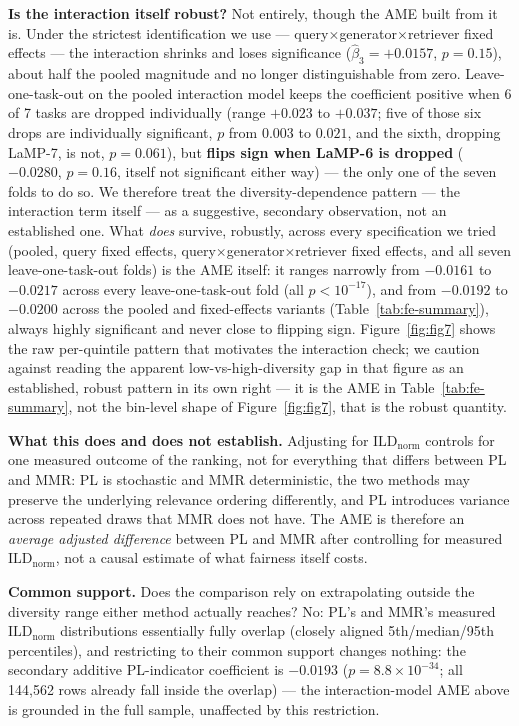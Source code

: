 \documentclass[11pt]{article}
\newcommand{\ild}{\ensuremath{\mathrm{ILD}}}
\newcommand{\ildnorm}{\ensuremath{\ild_{\mathrm{norm}}}}
\begin{document}
\textbf{Is the interaction itself robust?} Not entirely, though the AME
built from it is. Under the strictest identification we use ---
query$\times$generator$\times$retriever fixed effects --- the interaction
shrinks and loses significance ($\hat\beta_3=+0.0157$, $p=0.15$), about
half the pooled magnitude and no longer distinguishable from zero.
Leave-one-task-out on the pooled interaction model keeps the coefficient
positive when 6 of 7 tasks are dropped individually (range $+0.023$ to
$+0.037$; five of those six drops are individually significant, $p$ from
$0.003$ to $0.021$, and the sixth, dropping LaMP-7, is not, $p=0.061$),
but \textbf{flips sign when LaMP-6 is dropped} ($-0.0280$, $p=0.16$, itself
not significant either way) --- the only one of the seven folds to do so. We therefore treat the diversity-dependence
pattern --- the interaction term itself --- as a suggestive, secondary
observation, not an established one. What \emph{does} survive, robustly,
across every specification we tried (pooled, query fixed effects,
query$\times$generator$\times$retriever fixed effects, and all seven
leave-one-task-out folds) is the AME itself: it ranges narrowly from
$-0.0161$ to $-0.0217$ across every leave-one-task-out fold (all
$p<10^{-17}$), and from $-0.0192$ to $-0.0200$ across the pooled and
fixed-effects variants (Table~\ref{tab:fe-summary}), always
highly significant and never close to flipping sign. Figure~\ref{fig:fig7}
shows the raw per-quintile pattern that motivates the interaction check;
we caution against reading the apparent low-vs-high-diversity gap in that
figure as an established, robust pattern in its own right --- it is the
AME in Table~\ref{tab:fe-summary}, not the bin-level shape of
Figure~\ref{fig:fig7}, that is the robust quantity.

\textbf{What this does and does not establish.} Adjusting for \ildnorm{}
controls for one measured outcome of the ranking, not for everything that
differs between PL and MMR: PL is stochastic and MMR deterministic, the
two methods may preserve the underlying relevance ordering differently,
and PL introduces variance across repeated draws that MMR does not have.
The AME is therefore an \emph{average adjusted difference} between PL and
MMR after controlling for measured \ildnorm{}, not a causal estimate of
what fairness itself costs.

\textbf{Common support.} Does the comparison rely on extrapolating outside
the diversity range either method actually reaches? No: PL's and MMR's
measured \ildnorm{} distributions essentially fully overlap (closely
aligned 5th/median/95th percentiles), and restricting to their common
support changes nothing: the secondary additive PL-indicator coefficient
is $-0.0193$ ($p=8.8\times10^{-34}$; all 144{,}562 rows already fall
inside the overlap) --- the interaction-model AME above is grounded in the
full sample, unaffected by this restriction.
\end{document}
